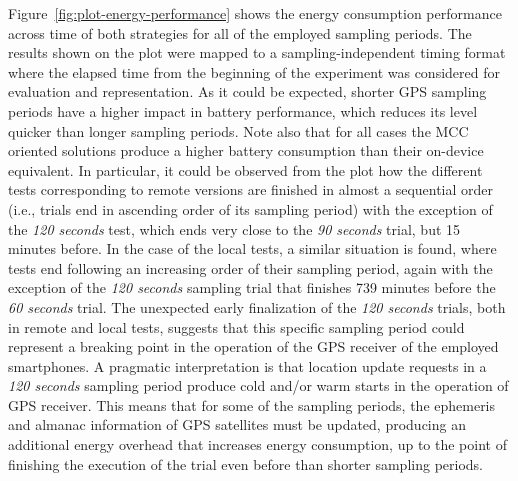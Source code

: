 \documentclass[ENG,PhD]{cinvestav}
\begin{document}
Figure~\ref{fig:plot-energy-performance} shows the energy consumption performance across time of both strategies for all of the employed sampling periods.
The results shown on the plot were mapped to a sampling-independent timing format where the elapsed time from the beginning of the experiment was considered for evaluation and representation.
As it could be expected, shorter GPS sampling periods have a higher impact in battery performance, which reduces its level quicker than longer sampling periods.
Note also that for all cases the MCC oriented solutions produce a higher battery consumption than their on-device equivalent.
In particular, it could be observed from the plot how the different tests corresponding to remote versions are finished in almost a sequential order (i.e., trials end in ascending order of its sampling period) with the exception of the \emph{120 seconds} test, which ends very close to the \emph{90 seconds} trial, but 15 minutes before.
In the case of the local tests, a similar situation is found, where tests end following an increasing order of their sampling period, again with the exception of the \emph{120 seconds} sampling trial that finishes 739 minutes before the \emph{60 seconds} trial.
The unexpected early finalization of the \emph{120 seconds} trials, both in remote and local tests, suggests that this specific sampling period could represent a breaking point in the operation of the GPS receiver of the employed smartphones.
A pragmatic interpretation is that location update requests in a \emph{120 seconds} sampling period produce cold and/or warm starts in the operation of GPS receiver.
This means that for some of the sampling periods, the ephemeris and almanac information of GPS satellites must be updated, producing an additional energy overhead that increases energy consumption, up to the point of finishing the execution of the trial even before than shorter sampling periods.
\end{document}
